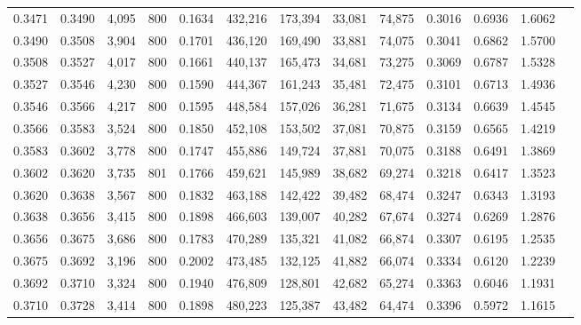 \begin{tabular}{rrrrrrrrrrrrr}
0.3471 & 0.3490 &  4,095 &   800 &                                     0.1634 & 432,216 & 173,394 &  33,081 &  74,875 & 0.3016 & 0.6936 & 1.6062 \\
0.3490 & 0.3508 &  3,904 &   800 &                                     0.1701 & 436,120 & 169,490 &  33,881 &  74,075 & 0.3041 & 0.6862 & 1.5700 \\
0.3508 & 0.3527 &  4,017 &   800 &                                     0.1661 & 440,137 & 165,473 &  34,681 &  73,275 & 0.3069 & 0.6787 & 1.5328 \\
0.3527 & 0.3546 &  4,230 &   800 &                                     0.1590 & 444,367 & 161,243 &  35,481 &  72,475 & 0.3101 & 0.6713 & 1.4936 \\
0.3546 & 0.3566 &  4,217 &   800 &                                     0.1595 & 448,584 & 157,026 &  36,281 &  71,675 & 0.3134 & 0.6639 & 1.4545 \\
0.3566 & 0.3583 &  3,524 &   800 &                                     0.1850 & 452,108 & 153,502 &  37,081 &  70,875 & 0.3159 & 0.6565 & 1.4219 \\
0.3583 & 0.3602 &  3,778 &   800 &                                     0.1747 & 455,886 & 149,724 &  37,881 &  70,075 & 0.3188 & 0.6491 & 1.3869 \\
0.3602 & 0.3620 &  3,735 &   801 &                                     0.1766 & 459,621 & 145,989 &  38,682 &  69,274 & 0.3218 & 0.6417 & 1.3523 \\
0.3620 & 0.3638 &  3,567 &   800 &                                     0.1832 & 463,188 & 142,422 &  39,482 &  68,474 & 0.3247 & 0.6343 & 1.3193 \\
0.3638 & 0.3656 &  3,415 &   800 &                                     0.1898 & 466,603 & 139,007 &  40,282 &  67,674 & 0.3274 & 0.6269 & 1.2876 \\
0.3656 & 0.3675 &  3,686 &   800 &                                     0.1783 & 470,289 & 135,321 &  41,082 &  66,874 & 0.3307 & 0.6195 & 1.2535 \\
0.3675 & 0.3692 &  3,196 &   800 &                                     0.2002 & 473,485 & 132,125 &  41,882 &  66,074 & 0.3334 & 0.6120 & 1.2239 \\
0.3692 & 0.3710 &  3,324 &   800 &                                     0.1940 & 476,809 & 128,801 &  42,682 &  65,274 & 0.3363 & 0.6046 & 1.1931 \\
0.3710 & 0.3728 &  3,414 &   800 &                                     0.1898 & 480,223 & 125,387 &  43,482 &  64,474 & 0.3396 & 0.5972 & 1.1615 \\

\end{tabular}

